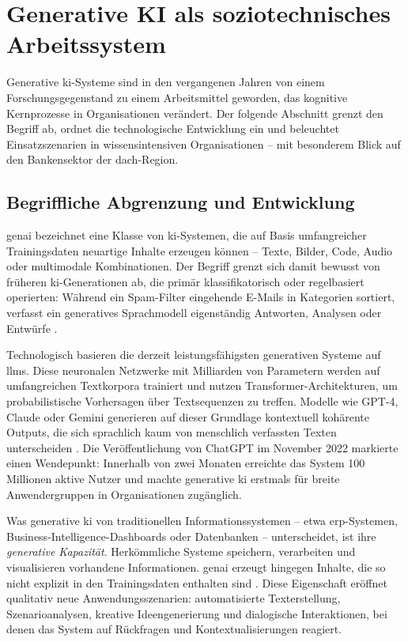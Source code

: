 \section{Generative KI als soziotechnisches Arbeitssystem}
\label{sec:genai}

Generative \acrshort{ki}-Systeme sind in den vergangenen Jahren von einem Forschungsgegenstand zu einem Arbeitsmittel geworden, das kognitive Kernprozesse in Organisationen verändert. Der folgende Abschnitt grenzt den Begriff ab, ordnet die technologische Entwicklung ein und beleuchtet Einsatzszenarien in wissensintensiven Organisationen -- mit besonderem Blick auf den Bankensektor der \acrshort{dach}-Region.

\subsection{Begriffliche Abgrenzung und Entwicklung}

\gls{genai} bezeichnet eine Klasse von \acrshort{ki}-Systemen, die auf Basis umfangreicher Trainingsdaten neuartige Inhalte erzeugen können -- Texte, Bilder, Code, Audio oder multimodale Kombinationen. Der Begriff grenzt sich damit bewusst von früheren \acrshort{ki}-Generationen ab, die primär klassifikatorisch oder regelbasiert operierten: Während ein Spam-Filter eingehende E-Mails in Kategorien sortiert, verfasst ein generatives Sprachmodell eigenständig Antworten, Analysen oder Entwürfe \parencite{brynjolfssonGenerativeAIWork2025}.

Technologisch basieren die derzeit leistungsfähigsten generativen Systeme auf \glspl{llm}. Diese neuronalen Netzwerke mit Milliarden von Parametern werden auf umfangreichen Textkorpora trainiert und nutzen Transformer-Architekturen, um probabilistische Vorhersagen über Textsequenzen zu treffen. Modelle wie GPT-4, Claude oder Gemini generieren auf dieser Grundlage kontextuell kohärente Outputs, die sich sprachlich kaum von menschlich verfassten Texten unterscheiden \parencite{brynjolfssonGenerativeAIWork2025}. Die Veröffentlichung von ChatGPT im November 2022 markierte einen Wendepunkt: Innerhalb von zwei Monaten erreichte das System 100 Millionen aktive Nutzer und machte generative \gls{ki} erstmals für breite Anwendergruppen in Organisationen zugänglich.

Was generative \gls{ki} von traditionellen Informationssystemen -- etwa \acrshort{erp}-Systemen, Business-Intelligence-Dashboards oder Datenbanken -- unterscheidet, ist ihre \textit{generative Kapazität}. Herkömmliche Systeme speichern, verarbeiten und visualisieren vorhandene Informationen. \gls{genai} erzeugt hingegen Inhalte, die so nicht explizit in den Trainingsdaten enthalten sind \parencite{bankinsMultilevelReviewArtificial2024}. Diese Eigenschaft eröffnet qualitativ neue Anwendungsszenarien: automatisierte Texterstellung, Szenarioanalysen, kreative Ideengenerierung und dialogische Interaktionen, bei denen das System auf Rückfragen und Kontextualisierungen reagiert.

